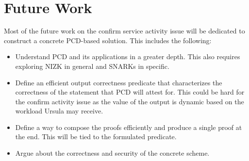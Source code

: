 \section{Future Work}
\label{future-work}
Most of the future work on the confirm service activity issue will be dedicated to construct a concrete PCD-based solution. This includes the following:
\begin{itemize}
\item Understand PCD and its applications in a greater depth. This also requires exploring NIZK in general and SNARKs in specific. 

\item Define an efficient output correctness predicate that characterizes the correctness of the statement that PCD will attest for. This could be hard for the confirm activity issue as the value of the output is dynamic based on the workload Ursula may receive.

\item Define a way to compose the proofs efficiently and produce a single proof at the end. This will be tied to the formulated predicate.

\item Argue about the correctness and security of the concrete scheme.
\end{itemize} 


